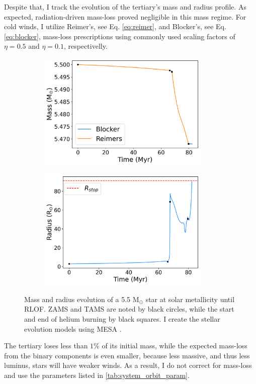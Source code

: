 Despite that, I track the evolution of the tertiary's mass and radius profile. As expected, radiation-driven mass-loss proved negligible in this mass regime. For cold winds, I utilize Reimer's, see Eq. \eqref{eq:reimer}, and Blocker's, see Eq. \eqref{eq:blocker}, mass-loss prescriptions using commonly used scaling factors of $\eta = 0.5$ and $\eta = 0.1$, respectivelly. 
\begin{figure}[H]
    \centering
    \begin{subfigure}{.5\textwidth}
    \centering
    \includegraphics[width=0.9\textwidth]{Thesis/graphs/giant_1-1mass_loss.pdf}
    \label{fig:mass_loss}
    \end{subfigure}%
    \begin{subfigure}{.5\textwidth}
    \centering
    \includegraphics[width=0.9\textwidth]{Thesis/graphs/giant_1-1radius.pdf}
    \label{fig:radius_profile}
    \end{subfigure}
    \caption{ Mass and radius evolution of a 5.5 M$_{\odot}$ star at solar metallicity until RLOF. ZAMS and TAMS are noted by black circles, while the start and end of helium burning by black squares. I create the stellar evolution models using MESA \citep{paxton2010modules,paxton2013modules,paxton2015modules,paxton2019modules}.}
\end{figure}
The tertiary loses less than $1\%$ of its 
initial mass, while the expected mass-loss from the binary components is even smaller, because less massive, and thus less luminus, stars will have weaker winds. As a result, I do not correct for mass-loss and use the parameters listed in  \cref{tab:system_orbit_param}.  

